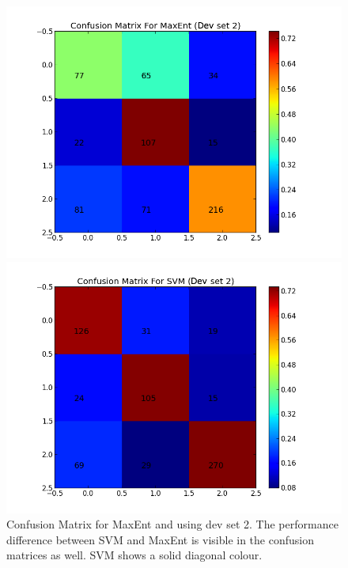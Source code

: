\begin{figure}[t!]
	\centering
	\begin{minipage}{.45\linewidth}
		\includegraphics[width=\linewidth]{../img/plots/analysis/maxent_confusion_matrix_best_diff_test.png}
	\end{minipage}
	\hspace{0.05\linewidth}
	\begin{minipage}{.45\linewidth}
		\includegraphics[width=\linewidth]{../img/plots/analysis/svm_confusion_matrix_best_diff_test.png}
	\end{minipage}
	\caption[Confusion Matrix for MaxEnt and SVM using dev set 2]{Confusion Matrix for MaxEnt and  using dev set 2. The performance difference between SVM and MaxEnt is visible in the confusion matrices as well. SVM shows a solid diagonal colour.}
	\label{fig:best_result_confusion_testset2}
\end{figure}


